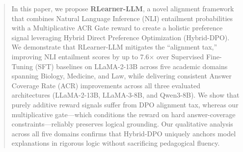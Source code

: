 \begin{abstract}
In this paper, we propose \textbf{RLearner-LLM}, a novel alignment framework that combines Natural Language Inference (NLI) entailment probabilities with a Multiplicative ACR Gate reward to create a holistic preference signal leveraging Hybrid Direct Preference Optimization (Hybrid-DPO). We demonstrate that RLearner-LLM mitigates the ``alignment tax,'' improving NLI entailment scores by up to 7.6$\times$ over Supervised Fine-Tuning (SFT) baselines on LLaMA-2-13B across five academic domains spanning Biology, Medicine, and Law, while delivering consistent Answer Coverage Rate (ACR) improvements across all three evaluated architectures (LLaMA-2-13B, LLaMA-3-8B, and Qwen3-8B). We show that purely additive reward signals suffer from DPO alignment tax, whereas our multiplicative gate—which conditions the reward on hard answer-coverage constraints—reliably preserves logical grounding. Our qualitative analysis across all five domains confirms that Hybrid-DPO uniquely anchors model explanations in rigorous logic without sacrificing pedagogical fluency.
\end{abstract}
